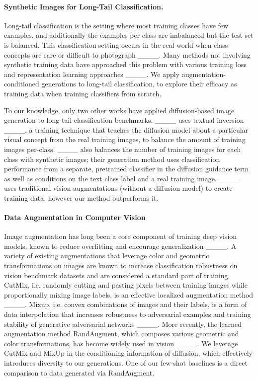 \paragraph{Synthetic Images for Long-Tail Classification.}
Long-tail classification is the setting where most training classes have few examples, and additionally the examples per class are imbalanced but the test set is balanced. This classification setting occurs in the real world when class concepts are rare or difficult to photograph ____. Many methods not involving synthetic training data have approached this problem with various training loss and representation learning approaches ____. 
We apply augmentation-conditioned generations to long-tail classification, to explore their efficacy as training data when training classifiers from scratch.

To our knowledge, only two other works have applied diffusion-based image generation to long-tail classification benchmarks. ____ uses textual inversion ____, a training technique that teaches the diffusion model about a particular visual concept from the real training images, to balance the amount of training images per-class. ____ also balances the number of training images for each class with synthetic images; their generation method uses classification performance from a separate, pretrained classifier in the diffusion guidance term as well as conditions on the text class label and a real training image. 
____ uses traditional vision augmentations (without a diffusion model) to create training data, however our method outperforms it.

\vspace{-0.3cm}
\paragraph{Data Augmentation in Computer Vision}
Image augmentation has long been a core component of training deep vision models, known to reduce overfitting and encourage generalization ____. A variety of existing augmentations that leverage color and geometric transformations on images are known to increase classification robustness on vision benchmark datasets and are considered a standard part of training. 
CutMix, i.e. randomly cutting and pasting pixels between training images while proportionally mixing image labels, is an effective localized augmentation method ____.
Mixup, i.e. convex combinations of images and their labels, is a form of data interpolation that increases robustness to adversarial examples and training stability of generative adversarial networks ____.
More recently, the learned augmentation method RandAugment, which composes various geometric and color transformations, has become widely used in vision ____. 
We leverage CutMix and MixUp in the conditioning information of diffusion, which effectively introduces diversity to our generations. One of our few-shot baselines is a direct comparison to data generated via RandAugment. 
